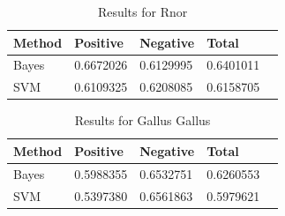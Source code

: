 \documentclass[10pt]{article}
\begin{document}
\begin{table}[h]
\begin{center}
\begin{tabular}{| l | l | l | l | l |}
\hline
Method & Positive & Negative & Total\\ \hline
Bayes & 0.6672026 & 0.6129995 & 0.6401011\\ \hline
SVM & 0.6109325 & 0.6208085 & 0.6158705\\ \hline
\end{tabular}
\end{center}
\caption{Results for Rnor}
\label{table:rnorresults}
\end{table}
\begin{table}[h]
\begin{center}
\begin{tabular}{| l | l | l | l | l |}
\hline
Method & Positive & Negative & Total\\ \hline
Bayes & 0.5988355 & 0.6532751 & 0.6260553\\ \hline
SVM & 0.5397380 & 0.6561863 & 0.5979621\\ \hline
\end{tabular}
\end{center}
\caption{Results for Gallus Gallus}
\label{table:gallusresults}
\end{table}
\end{document}
